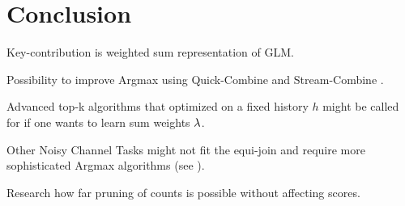 \chapter{Conclusion}
\label{ch:conclusion}

\begin{draft}
Key-contribution is weighted sum representation of GLM.

Possibility to improve Argmax using Quick-Combine \parencite{Guentzer2000} and
Stream-Combine \parencite{Guentzer2001}.

Advanced top-k algorithms that optimized on a fixed history $h$ might be called
for if one wants to learn sum weights $\lambda$.

Other Noisy Channel Tasks might not fit the equi-join and require more
sophisticated Argmax algorithms (see \parencite{Ilyas2004}).

Research how far pruning of counts is possible without affecting scores.
\end{draft}
